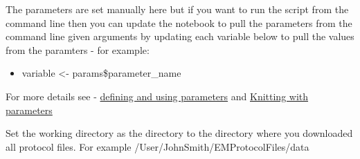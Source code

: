 \documentclass[
]{book}
\newenvironment{Shaded}{\begin{snugshade}}{\end{snugshade}}
\newcommand{\CommentTok}[1]{\textcolor[rgb]{0.56,0.35,0.01}{\textit{#1}}}
\newcommand{\NormalTok}[1]{#1}
\newcommand{\OtherTok}[1]{\textcolor[rgb]{0.56,0.35,0.01}{#1}}
\newcommand{\SpecialCharTok}[1]{\textcolor[rgb]{0.81,0.36,0.00}{\textbf{#1}}}
\providecommand{\tightlist}{%
  \setlength{\itemsep}{0pt}\setlength{\parskip}{0pt}}
\begin{document}
The parameters are set manually here but if you want to run the script from the command line then you can update the notebook to pull the parameters from the command line given arguments by updating each variable below to pull the values from the paramters - for example:

\begin{itemize}
\tightlist
\item
  variable \textless- params\$parameter\_name
\end{itemize}

For more details see - \href{https://bookdown.org/yihui/rmarkdown/params-declare.html}{defining and using parameters} and \href{https://bookdown.org/yihui/rmarkdown/params-knit.html}{Knitting with parameters}

\begin{Shaded}
\end{Shaded}

Set the working directory as the directory to the directory where you downloaded all protocol files. For example /User/JohnSmith/EMProtocolFiles/data
\end{document}
